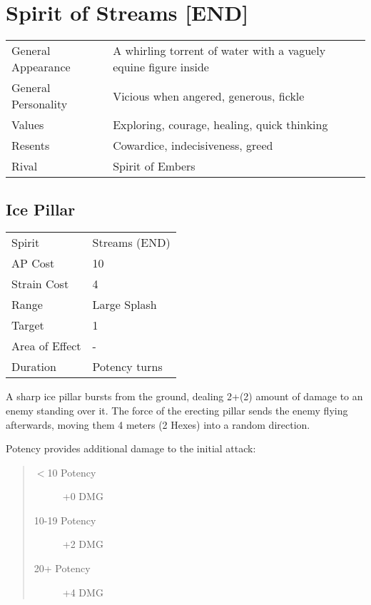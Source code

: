 \documentclass[11pt,a4paper,twocolumn]{book}
\begin{document}
\section*{Spirit of Streams [END]}
{
	\begin{tabu} to 75mm{| X[l,4] | X[l,8] |}
		\hline
		General Appearance  & A whirling torrent of water with a vaguely equine figure inside \\
		General Personality & Vicious when angered, generous, fickle                          \\
		Values              & Exploring, courage, healing, quick thinking                     \\
		Resents             & Cowardice, indecisiveness, greed                                \\
		Rival               & Spirit of Embers                                              \\ \hline
	\end{tabu}
	
}

\medskip

\subsection*{Ice Pillar}
{
	\begin{tabu} to 70mm{| X[l,4] | X[l,7] |}
		\hline
		Spirit         & Streams (END)       \\
		AP Cost        & 10                   \\
		Strain Cost    & 4                    \\
		Range          & Large Splash         \\
		Target         & 1                    \\
		Area of Effect & -                    \\
		Duration       & Potency turns \\ \hline
	\end{tabu}
	
}
\medskip

A sharp ice pillar bursts from the ground, dealing 2+(2) amount of damage to an enemy standing over it. The force of the erecting pillar sends the enemy flying afterwards, moving them 4 meters (2 Hexes) into a random direction.

Potency provides additional damage to the initial attack:
\begin{quote}
	\begin{description}
		\item[$<$10 Potency] 	+0 DMG
		\item[10-19 Potency] 	+2 DMG
		\item[20+ Potency]  	+4 DMG
	\end{description}	
\end{quote}
\end{document}
